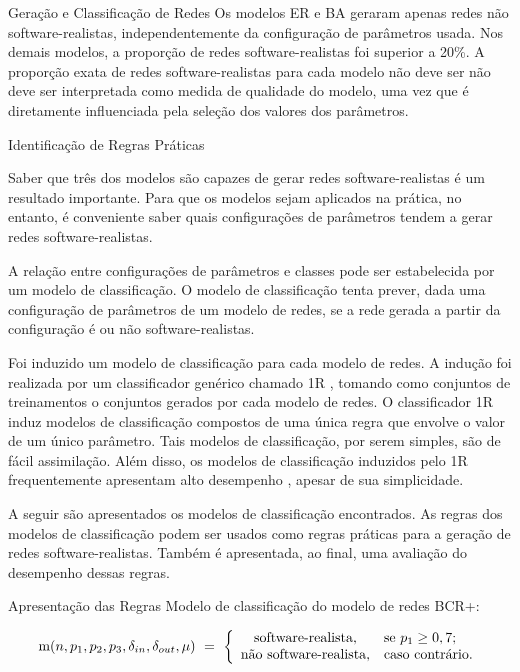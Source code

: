 \begin{section}{Geração e Classificação de Redes}
	Os modelos ER e BA geraram apenas redes não software-realistas, independentemente da configuração de parâmetros usada. Nos demais modelos, a proporção de redes software-realistas foi superior a 20\%. A proporção exata de redes software-realistas para cada modelo não deve ser não deve ser interpretada como medida de qualidade do modelo, uma vez que é diretamente influenciada pela seleção dos valores dos parâmetros.

\end{section}

\begin{section}{Identificação de Regras Práticas}
	
	Saber que três dos modelos são capazes de gerar redes software-realistas é um resultado importante. Para que os modelos sejam aplicados na prática, no entanto, é conveniente saber quais configurações de parâmetros tendem a gerar redes software-realistas.
	
	A relação entre configurações de parâmetros e classes pode ser estabelecida por um modelo de classificação. O modelo de classificação tenta prever, dada uma configuração de parâmetros de um modelo de redes, se a rede gerada a partir da configuração é ou não software-realistas.
	
	Foi induzido um modelo de classificação para cada modelo de redes. A indução foi realizada por um classificador genérico chamado 1R \cite{OneR}, tomando como conjuntos de treinamentos o conjuntos gerados por cada modelo de redes. O classificador 1R induz modelos de classificação compostos de uma única regra que envolve o valor de um único parâmetro. Tais modelos de classificação, por serem simples, são de fácil assimilação. Além disso, os modelos de classificação induzidos pelo 1R frequentemente apresentam alto desempenho \cite{OneR}, apesar de sua simplicidade.
	
	A seguir são apresentados os modelos de classificação encontrados. As regras dos modelos de classificação podem ser usados como regras práticas para a geração de redes software-realistas. Também é apresentada, ao final, uma avaliação do desempenho dessas regras.
	
\begin{subsection}{Apresentação das Regras}
	Modelo de classificação do modelo de redes BCR+:
		
	$$
	\mathrm{m}(n, p_1, p_2, p_3, \delta_{in}, \delta_{out}, \mu) ~=~
	\left\{
	\begin{array}{cl}
	\mbox{software-realista,} & \mbox{se } p_1 \ge 0,7; \\
	\mbox{não software-realista,} & \mbox{caso contrário.}
	\end{array}
	\right.
	$$
	

\end{subsection}
\end{section}
